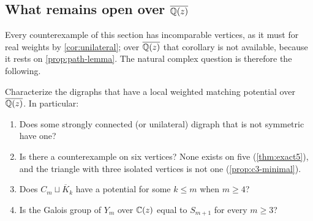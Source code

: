 \subsection{What remains open over \texorpdfstring{$\overline{\mathbb{Q}(z)}$}{the algebraic closure}}
Every counterexample of this section has incomparable vertices, as it must for real weights by \cref{cor:unilateral}; over $\overline{\mathbb{Q}(z)}$ that corollary is not available, because it rests on \cref{prop:path-lemma}. The natural complex question is therefore the following.

\begin{problem}\label{prob:complex}
Characterize the digraphs that have a local weighted matching potential over $\overline{\mathbb{Q}(z)}$. In particular:
\begin{enumerate}[label=\textup{(\alph*)}]
\item Does some strongly connected \textup{(}or unilateral\textup{)} digraph that is not symmetric have one?
\item Is there a counterexample on six vertices? None exists on five (\cref{thm:exact5}), and the triangle with three isolated vertices is not one (\cref{prop:c3-minimal}).
\item Does $C_m\sqcup\overline{K}_k$ have a potential for some $k\le m$ when $m\ge4$?
\item Is the Galois group of $Y_m$ over $\mathbb{C}(z)$ equal to $S_{m+1}$ for every $m\ge3$?
\end{enumerate}
\end{problem}

